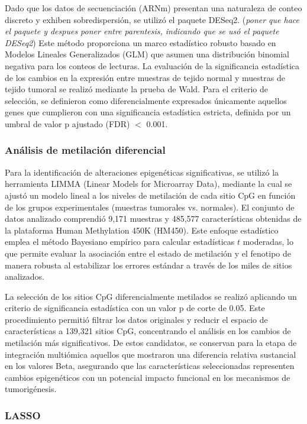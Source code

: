 \documentclass[review,12pt,times,number]{elsarticle}
\begin{document}
Dado que los datos de secuenciación (ARNm) presentan una naturaleza de conteo discreto y exhiben sobredispersión, se utilizó el paquete DESeq2. (\textit{poner que hace el paquete y despues poner entre parentesis, indicando que se usó el paquete DESeq2}) Este método proporciona un marco estadístico robusto basado en Modelos Lineales Generalizados (GLM) que asumen una distribución binomial negativa para los conteos de lecturas. La evaluación de la significancia estadística de los cambios en la expresión entre muestras de tejido normal y muestras de tejido tumoral se realizó mediante la prueba de Wald. Para el criterio de selección, se definieron como diferencialmente expresados únicamente aquellos genes que cumplieron con una significancia estadística estricta, definida por un umbral de valor p ajustado (FDR) $<$ 0.001.

\subsubsection{Análisis de metilación diferencial}

Para la identificación de alteraciones epigenéticas significativas, se utilizó la herramienta LIMMA (Linear Models for Microarray Data), mediante la cual se ajustó un modelo lineal a los niveles de metilación de cada sitio CpG en función de los grupos experimentales (muestras tumorales vs. normales). El conjunto de datos analizado comprendió 9,171 muestras y 485,577 características obtenidas de la plataforma Human Methylation 450K (HM450). Este enfoque estadístico emplea el método Bayesiano empírico para calcular estadísticas $t$ moderadas, lo que permite evaluar la asociación entre el estado de metilación y el fenotipo de manera robusta al estabilizar los errores estándar a través de los miles de sitios analizados.

La selección de los sitios CpG diferencialmente metilados se realizó aplicando un criterio de significancia estadística con un valor p de corte de 0.05. Este procedimiento permitió filtrar los datos originales y reducir el espacio de características a 139,321 sitios CpG, concentrando el análisis en los cambios de metilación más significativos. De estos candidatos, se conservan para la etapa de integración multiómica aquellos que mostraron una diferencia relativa sustancial en los valores Beta, asegurando que las características seleccionadas representen cambios epigenéticos con un potencial impacto funcional en los mecanismos de tumorigénesis.


\subsubsection{LASSO}
\end{document}
